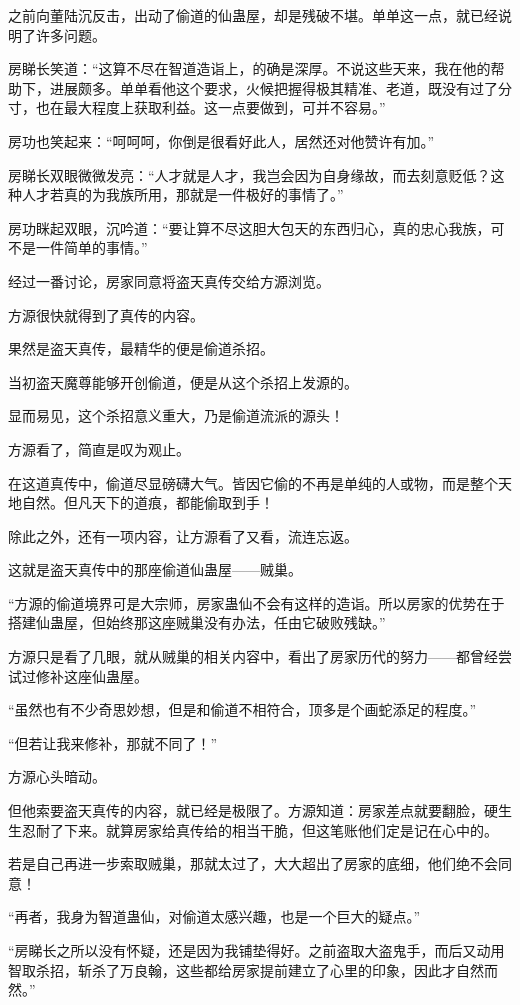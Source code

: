 \begin{this_body}
之前向董陆沉反击，出动了偷道的仙蛊屋，却是残破不堪。单单这一点，就已经说明了许多问题。

房睇长笑道：“这算不尽在智道造诣上，的确是深厚。不说这些天来，我在他的帮助下，进展颇多。单单看他这个要求，火候把握得极其精准、老道，既没有过了分寸，也在最大程度上获取利益。这一点要做到，可并不容易。”

房功也笑起来：“呵呵呵，你倒是很看好此人，居然还对他赞许有加。”

房睇长双眼微微发亮：“人才就是人才，我岂会因为自身缘故，而去刻意贬低？这种人才若真的为我族所用，那就是一件极好的事情了。”

房功眯起双眼，沉吟道：“要让算不尽这胆大包天的东西归心，真的忠心我族，可不是一件简单的事情。”

经过一番讨论，房家同意将盗天真传交给方源浏览。

方源很快就得到了真传的内容。

果然是盗天真传，最精华的便是偷道杀招。

当初盗天魔尊能够开创偷道，便是从这个杀招上发源的。

显而易见，这个杀招意义重大，乃是偷道流派的源头！

方源看了，简直是叹为观止。

在这道真传中，偷道尽显磅礴大气。皆因它偷的不再是单纯的人或物，而是整个天地自然。但凡天下的道痕，都能偷取到手！

除此之外，还有一项内容，让方源看了又看，流连忘返。

这就是盗天真传中的那座偷道仙蛊屋——贼巢。

“方源的偷道境界可是大宗师，房家蛊仙不会有这样的造诣。所以房家的优势在于搭建仙蛊屋，但始终那这座贼巢没有办法，任由它破败残缺。”

方源只是看了几眼，就从贼巢的相关内容中，看出了房家历代的努力——都曾经尝试过修补这座仙蛊屋。

“虽然也有不少奇思妙想，但是和偷道不相符合，顶多是个画蛇添足的程度。”

“但若让我来修补，那就不同了！”

方源心头暗动。

但他索要盗天真传的内容，就已经是极限了。方源知道：房家差点就要翻脸，硬生生忍耐了下来。就算房家给真传给的相当干脆，但这笔账他们定是记在心中的。

若是自己再进一步索取贼巢，那就太过了，大大超出了房家的底细，他们绝不会同意！

“再者，我身为智道蛊仙，对偷道太感兴趣，也是一个巨大的疑点。”

“房睇长之所以没有怀疑，还是因为我铺垫得好。之前盗取大盗鬼手，而后又动用智取杀招，斩杀了万良翰，这些都给房家提前建立了心里的印象，因此才自然而然。”


\end{this_body}
